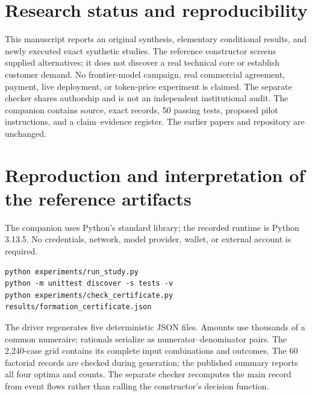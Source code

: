 \documentclass[11pt,letterpaper]{article}
\theoremstyle{remark}\newtheorem{remark}{Remark}[section]
\begin{document}
\section*{Research status and reproducibility}
This manuscript reports an original synthesis, elementary conditional results, and newly executed exact synthetic studies. The reference constructor screens supplied alternatives; it does not discover a real technical core or establish customer demand. No frontier-model campaign, real commercial agreement, payment, live deployment, or token-price experiment is claimed. The separate checker shares authorship and is not an independent institutional audit. The companion contains source, exact records, 50 passing tests, proposed pilot instructions, and a claim--evidence register. The earlier papers and repository are unchanged.

\clearpage
\appendix
\section{Reproduction and interpretation of the reference artifacts}
\label{app:reproduction}
The companion uses Python's standard library; the recorded runtime is Python 3.13.5. No credentials, network, model provider, wallet, or external account is required.
\begin{lstlisting}
python experiments/run_study.py
python -m unittest discover -s tests -v
python experiments/check_certificate.py results/formation_certificate.json
\end{lstlisting}
The driver regenerates five deterministic JSON files. Amounts use thousands of a common numeraire; rationals serialize as numerator--denominator pairs. The 2,240-case grid contains its complete input combinations and outcomes. The 60 factorial records are checked during generation; the published summary reports all four optima and counts. The separate checker recomputes the main record from event flows rather than calling the constructor's decision function.
\end{document}
